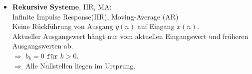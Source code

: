\begin{multicols*}{2}
\begin{itemize}
	
	\item \textbf{Rekursive Systeme}, IIR, MA:\\
	{\small Infinite Impulse Response(IIR), Moving-Average (AR)\\
		Keine Rückführung von Ausgang $y(n)$ auf Eingang $x(n)$.\\
		Aktueller Ausgangswert hängt nur vom aktuellen Eingangswert
		und früheren Ausgangswerten ab.}\\
	$\Rightarrow$ $b_k=0 \texttt{ für } k>0$.\\
	$\Rightarrow$ Alle Nullstellen liegen im Ursprung.
	

\end{itemize}
\end{multicols*}
